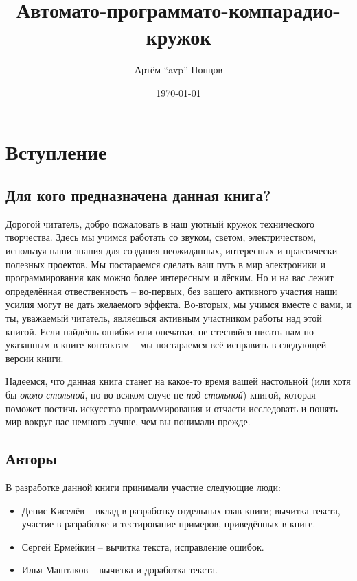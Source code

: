\documentclass[a4paper,twoside]{book}
\title{Автомато-программато-компарадио-кружок}
\author{Артём ``avp'' Попцов}
\date{\today}
\begin{document}
\maketitle

\tableofcontents

\chapter*{Вступление}

\section{Для кого предназначена данная книга?}
Дорогой читатель, добро пожаловать в наш уютный кружок технического творчества.
Здесь мы учимся работать со звуком, светом, электричеством, используя наши
знания для создания неожиданных, интересных и практически полезных проектов.  Мы
постараемся сделать ваш путь в мир электроники и программирования как можно
более интересным и лёгким.  Но и на вас лежит определённая отвественность --
во-первых, без вашего активного участия наши усилия могут не дать желаемого
эффекта.  Во-вторых, мы учимся вместе с вами, и ты, уважаемый читатель,
являешься активным участником работы над этой книгой.  Если найдёшь ошибки или
опечатки, не стесняйся писать нам по указанным в книге контактам -- мы
постараемся всё исправить в следующей версии книги.

Надеемся, что данная книга станет на какое-то время вашей настольной (или хотя
бы \emph{около-стольной}, но во всяком случе не \emph{под-стольной}) книгой,
которая поможет постичь искусство программирования и отчасти исследовать и
понять мир вокруг нас немного лучше, чем вы понимали прежде.

\section{Авторы}
В разработке данной книги принимали участие следующие люди:
\begin{itemize}
\item Денис Киселёв -- вклад в разработку отдельных глав книги; вычитка текста,
  участие в разработке и тестирование примеров, приведённых в книге.
\item Сергей Ермейкин -- вычитка текста, исправление ошибок.
\item Илья Маштаков – вычитка и доработка текста.
\end{itemize}
\end{document}
